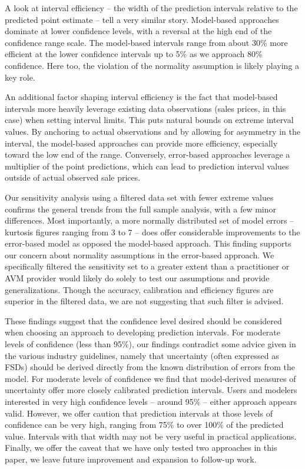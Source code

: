 \documentclass[colTwo]{anon}
\theoremstyle{definition}
\begin{document}
A look at interval efficiency -- the width of the prediction intervals relative to the predicted point estimate -- tell a very similar story. Model-based approaches dominate at lower confidence levels, with a reversal at the high end of the confidence range scale. The model-based intervals range from about 30\% more efficient at the lower confidence intervals up to 5\% as we approach 80\% confidence.  Here too, the violation of the normality assumption is likely playing a key role.  

An additional factor shaping interval efficiency is the fact that model-based intervals more heavily leverage existing data observations (sales prices, in this case) when setting interval limits.  This puts natural bounds on extreme interval values.  By anchoring to actual observations and by allowing for asymmetry in the interval, the model-based approaches can provide more efficiency, especially toward the low end of the range. Conversely, error-based approaches leverage a multiplier of the point predictions, which can lead to prediction interval values outside of actual observed sale prices.  

Our sensitivity analysis using a filtered data set with fewer extreme values confirms the general trends from the full sample analysis, with a few minor differences.  Most importantly, a more normally distributed set of model errors -- kurtosis figures ranging from 3 to 7 -- does offer considerable improvements to the error-based model as opposed the model-based approach.  This finding supports our concern about normality assumptions in the error-based approach.  We specifically filtered the sensitivity set to a greater extent than a practitioner or AVM provider would likely do solely to test our assumptions and provide generalizations.  Though the accuracy, calibration and efficiency figures are superior in the filtered data, we are not suggesting that such filter is advised.    

These findings suggest that the confidence level desired should be considered when choosing an approach to developing prediction intervals.  For moderate levels of confidence (less than 95\%), our findings contradict some advice given in the various industry guidelines, namely that uncertainty (often expressed as FSDs) should be derived directly from the known distribution of errors from the model.  For moderate levels of confidence we find that model-derived measures of uncertainty offer more closely calibrated prediction intervals.  Users and modelers interested in very high confidence levels -- around 95\% -- either approach appears valid.  However, we offer caution that prediction intervals at those levels of confidence can be very high, ranging from 75\% to over 100\% of the predicted value.  Intervals with that width may not be very useful in practical applications.  Finally, we offer the caveat that we have only tested two approaches in this paper, we leave future improvement and expansion to follow-up work. 
\end{document}
